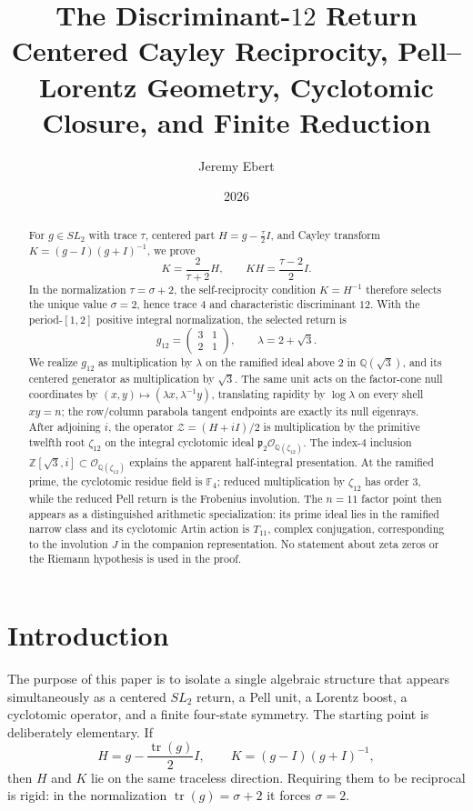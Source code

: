 \documentclass[11pt]{article}
\title{\textbf{The Discriminant-$12$ Return}\\
\large Centered Cayley Reciprocity, Pell--Lorentz Geometry, Cyclotomic Closure, and Finite Reduction}
\author{Jeremy Ebert}
\date{2026}
\theoremstyle{definition}
\theoremstyle{remark}
\newcommand{\Q}{\mathbb Q}
\newcommand{\Z}{\mathbb Z}
\newcommand{\F}{\mathbb F}
\newcommand{\OO}{\mathcal O}
\newcommand{\tr}{\operatorname{tr}}
\begin{document}
\maketitle

\begin{abstract}
For $g\in SL_2$ with trace $\tau$, centered part
$H=g-\tfrac{\tau}{2}I$, and Cayley transform
$K=(g-I)(g+I)^{-1}$, we prove
\[
K=\frac{2}{\tau+2}H,
\qquad
KH=\frac{\tau-2}{2}I.
\]
In the normalization $\tau=\sigma+2$, the self-reciprocity condition
$K=H^{-1}$ therefore selects the unique value $\sigma=2$, hence trace $4$
and characteristic discriminant $12$.  With the period-$[1,2]$ positive
integral normalization, the selected return is
\[
g_{12}=\begin{pmatrix}3&1\\2&1\end{pmatrix},
\qquad
\lambda=2+\sqrt3.
\]
We realize $g_{12}$ as multiplication by $\lambda$ on the ramified ideal above
$2$ in $\Q(\sqrt3)$, and its centered generator as multiplication by
$\sqrt3$.  The same unit acts on the factor-cone null coordinates by
$(x,y)\mapsto(\lambda x,\lambda^{-1}y)$, translating rapidity by
$\log\lambda$ on every shell $xy=n$; the row/column parabola tangent endpoints
are exactly its null eigenrays.  After adjoining $i$, the operator
$\mathcal Z=(H+iI)/2$ is multiplication by the primitive twelfth root
$\zeta_{12}$ on the integral cyclotomic ideal
$\mathfrak p_2\OO_{\Q(\zeta_{12})}$.  The index-$4$ inclusion
$\Z[\sqrt3,i]\subset\OO_{\Q(\zeta_{12})}$ explains the apparent half-integral
presentation.  At the ramified prime, the cyclotomic residue field is
$\F_4$; reduced multiplication by $\zeta_{12}$ has order $3$, while the
reduced Pell return is the Frobenius involution.  The $n=11$ factor point then
appears as a distinguished arithmetic specialization: its prime ideal lies in
the ramified narrow class and its cyclotomic Artin action is $T_{11}$, complex
conjugation, corresponding to the involution $J$ in the companion
representation.  No statement about zeta zeros or the Riemann hypothesis is
used in the proof.
\end{abstract}

\section{Introduction}

The purpose of this paper is to isolate a single algebraic structure that
appears simultaneously as a centered $SL_2$ return, a Pell unit, a Lorentz
boost, a cyclotomic operator, and a finite four-state symmetry.  The starting
point is deliberately elementary.  If
\[
H=g-\frac{\tr(g)}2I,
\qquad
K=(g-I)(g+I)^{-1},
\]
then $H$ and $K$ lie on the same traceless direction.  Requiring them to be
reciprocal is rigid: in the normalization $\tr(g)=\sigma+2$ it forces
$\sigma=2$.
\end{document}
